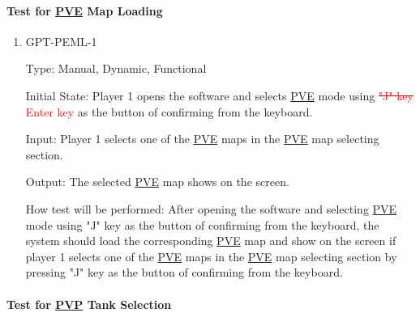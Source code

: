 \documentclass[12pt, titlepage]{article}
\begin{document}
\paragraph{Test for \underline{PVE} Map Loading}

\begin{enumerate}

\item{GPT-PEML-1\\}

Type: Manual, Dynamic, Functional
					
Initial State: Player 1 opens the software and selects \underline{PVE} mode using \textcolor{red}{\sout{"J" key}} \textcolor{red}{Enter key} as the button of confirming from the keyboard.
					
Input: Player 1 selects one of the \underline{PVE} maps in the \underline{PVE} map selecting section.
					
Output: The selected \underline{PVE} map shows on the screen.
					
How test will be performed: After opening the software and selecting \underline{PVE} mode using "J" key as the button of confirming from the keyboard, the system should load the corresponding \underline{PVE} map and show on the screen if player 1 selects one of the \underline{PVE} maps in the \underline{PVE} map selecting section by pressing "J" key as the button of confirming from the keyboard.

\end{enumerate}

\paragraph{Test for \underline{PVP} Tank Selection}
\end{document}
